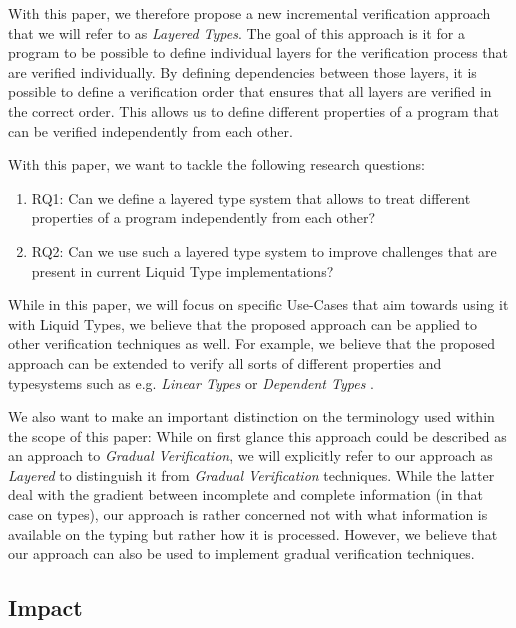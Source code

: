 With this paper, we therefore propose a new incremental verification approach that we will refer to as \textit{Layered Types}. The goal of this approach is it for a program to be possible to define individual layers for the verification process that are verified individually. By defining dependencies between those layers, it is possible to define a verification order that ensures that all layers are verified in the correct order. This allows us to define different properties of a program that can be verified independently from each other.

With this paper, we want to tackle the following research questions:

\begin{enumerate}
	\item RQ1: Can we define a layered type system that allows to treat different properties of a program independently from each other?
	\item RQ2: Can we use such a layered type system to improve challenges that are present in current Liquid Type implementations?
\end{enumerate}

While in this paper, we will focus on specific Use-Cases that aim towards using it with Liquid Types, we believe that the proposed approach can be applied to other verification techniques as well. For example, we believe that the proposed approach can be extended to verify all sorts of different properties and typesystems such as e.g. \textit{Linear Types} \cite{linear_types} or \textit{Dependent Types} \cite{dependent_types}.

We also want to make an important distinction on the terminology used within the scope of this paper: While on first glance this approach could be described as an approach to \textit{Gradual Verification}, we will explicitly refer to our approach as \textit{Layered} to distinguish it from \textit{Gradual Verification} techniques. While the latter deal with the gradient between incomplete and complete information (in that case on types), our approach is rather concerned not with what information is available on the typing but rather how it is processed. However, we believe that our approach can also be used to implement gradual verification techniques.

\subsection{Impact}
\label{ssec:impact}

